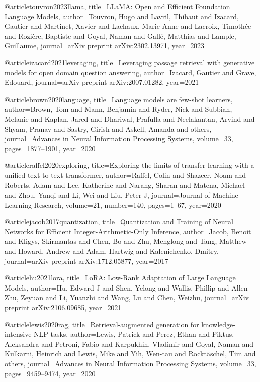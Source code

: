 @article{touvron2023llama,
  title={LLaMA: Open and Efficient Foundation Language Models},
  author={Touvron, Hugo and Lavril, Thibaut and Izacard, Gautier and Martinet, Xavier and Lachaux, Marie-Anne and Lacroix, Timothée and Rozière, Baptiste and Goyal, Naman and Gallé, Matthias and Lample, Guillaume},
  journal={arXiv preprint arXiv:2302.13971},
  year={2023}
}

@article{izacard2021leveraging,
  title={Leveraging passage retrieval with generative models for open domain question answering},
  author={Izacard, Gautier and Grave, Edouard},
  journal={arXiv preprint arXiv:2007.01282},
  year={2021}
}

@article{brown2020language,
  title={Language models are few-shot learners},
  author={Brown, Tom and Mann, Benjamin and Ryder, Nick and Subbiah, Melanie and Kaplan, Jared and Dhariwal, Prafulla and Neelakantan, Arvind and Shyam, Pranav and Sastry, Girish and Askell, Amanda and others},
  journal={Advances in Neural Information Processing Systems},
  volume={33},
  pages={1877--1901},
  year={2020}
}

@article{raffel2020exploring,
  title={Exploring the limits of transfer learning with a unified text-to-text transformer},
  author={Raffel, Colin and Shazeer, Noam and Roberts, Adam and Lee, Katherine and Narang, Sharan and Matena, Michael and Zhou, Yanqi and Li, Wei and Liu, Peter J},
  journal={Journal of Machine Learning Research},
  volume={21},
  number={140},
  pages={1--67},
  year={2020}
}

@article{jacob2017quantization,
  title={Quantization and Training of Neural Networks for Efficient Integer-Arithmetic-Only Inference},
  author={Jacob, Benoit and Kligys, Skirmantas and Chen, Bo and Zhu, Menglong and Tang, Matthew and Howard, Andrew and Adam, Hartwig and Kalenichenko, Dmitry},
  journal={arXiv preprint arXiv:1712.05877},
  year={2017}
}

@article{hu2021lora,
  title={LoRA: Low-Rank Adaptation of Large Language Models},
  author={Hu, Edward J and Shen, Yelong and Wallis, Phillip and Allen-Zhu, Zeyuan and Li, Yuanzhi and Wang, Lu and Chen, Weizhu},
  journal={arXiv preprint arXiv:2106.09685},
  year={2021}
}

@article{lewis2020rag,
  title={Retrieval-augmented generation for knowledge-intensive NLP tasks},
  author={Lewis, Patrick and Perez, Ethan and Piktus, Aleksandra and Petroni, Fabio and Karpukhin, Vladimir and Goyal, Naman and Kulkarni, Heinrich and Lewis, Mike and Yih, Wen-tau and Rockt{\"a}schel, Tim and others},
  journal={Advances in Neural Information Processing Systems},
  volume={33},
  pages={9459--9474},
  year={2020}
}

